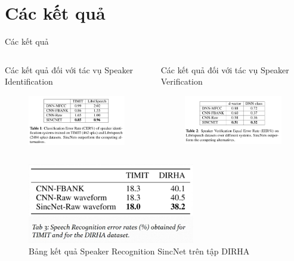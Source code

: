 \documentclass[notheorems, aspectratio=54]{beamer}
\begin{document}
\section{Các kết quả}
\begin{frame}{Các kết quả}
	\begin{columns}
		\begin{column}{0.5\textwidth}
			Các kết quả đối với tác vụ Speaker Identification
			\begin{figure}[H]
				\includegraphics[width=1\linewidth]{images/performance_speaker_identification.png}
			\end{figure}
		\end{column}
		\begin{column}{0.5\textwidth}
			Các kết quả đối với tác vụ Speaker Verification
			\begin{figure}[H]
				\includegraphics[width=1\linewidth]{images/performance_speaker_verification.png}
			\end{figure}
		\end{column}
	\end{columns}
	\begin{figure}[H]
		\centering
		\includegraphics[width=0.65\textwidth]{images/sr_sincnet_result.png}
		\caption{Bảng kết quả Speaker Recognition SincNet trên tập DIRHA}
		\label{fig:writing-thesis}
	\end{figure}	
\end{frame}
\end{document}

